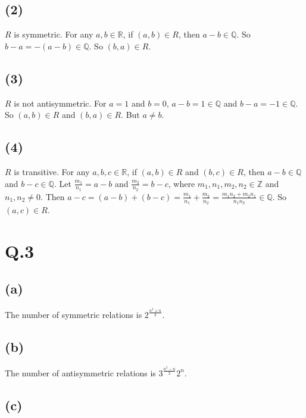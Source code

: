 \documentclass[a4paper,12pt]{article}
\begin{document}
\subsection*{(2)}

$R$ is symmetric. 
For any $a, b \in \mathbb{R}$, if $(a, b) \in R$, then $a - b \in \mathbb{Q}$. So $b - a = -(a - b) \in \mathbb{Q}$. 
So $(b, a) \in R$.

\subsection*{(3)}

$R$ is not antisymmetric. 
For $a = 1$ and $b = 0$, $a - b = 1 \in \mathbb{Q}$ and $b - a = -1 \in \mathbb{Q}$. 
So $(a, b) \in R$ and $(b, a) \in R$. 
But $a \neq b$.

\subsection*{(4)}

$R$ is transitive. 
For any $a, b, c \in \mathbb{R}$, if $(a, b) \in R$ and $(b, c) \in R$, then $a - b \in \mathbb{Q}$ and $b - c \in \mathbb{Q}$. 
Let $\frac{m_1}{n_1} = a - b$ and $\frac{m_2}{n_2} = b - c$, where $m_1, n_1, m_2, n_2 \in \mathbb{Z}$ and $n_1, n_2 \neq 0$. 
Then $a - c = (a - b) + (b - c) = \frac{m_1}{n_1} + \frac{m_2}{n_2} = \frac{m_1n_2 + m_2n_1}{n_1n_2} \in \mathbb{Q}$.
So $(a, c) \in R$.

\section*{Q.3}

\subsection*{(a)}

The number of symmetric relations is $2^{\frac{n^2+n}{2}}$.

\subsection*{(b)}

The number of antisymmetric relations is $3^{\frac{n^2-n}{2}}2^{n}$.

\subsection*{(c)}
\end{document}
